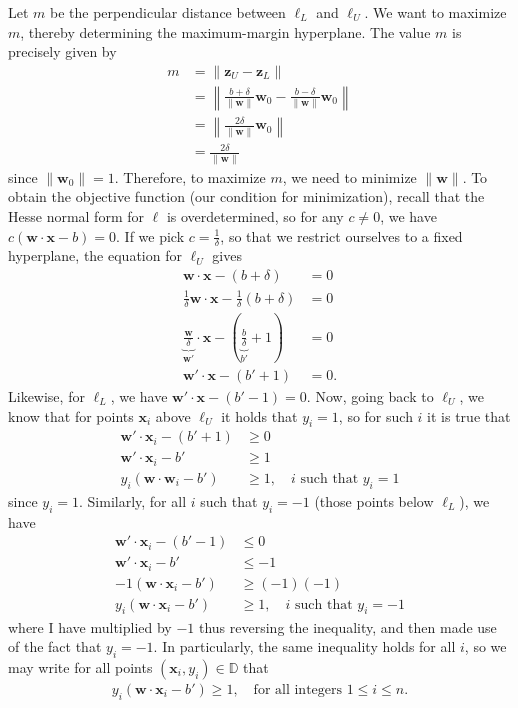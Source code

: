 \documentclass[12pt]{article}
\begin{document}
\begin{enumerate}
Let $m$ be the perpendicular distance between $\ell_L$ and $\ell_U$. We want to
maximize $m$, thereby determining the maximum-margin hyperplane. The value
$m$ is precisely given by
\begin{align*}
	m &= \|\mathbf{z}_U-\mathbf{z}_L\|\\
	&=\left\|\frac{b+\delta}{\|\mathbf{w}\|}\mathbf{w}_0 - \frac{b-\delta}{\|\mathbf{w}\|}\mathbf{w}_0\right\|\\
	&=\left\|\frac{2\delta}{\|\mathbf{w}\|}\mathbf{w}_0\right\|\\
	&=\frac{2\delta}{\|\mathbf{w}\|}
\end{align*}
since $\|\mathbf{w}_0\|=1$. Therefore, to maximize $m$, we need to minimize $\|\mathbf{w}\|$.
To obtain the objective function (our condition for minimization), recall that the Hesse normal
form for $\ell$ is overdetermined, so for any $c\neq 0$, we have $c(\mathbf{w}\cdot \mathbf{x}-b)=0$.
If we pick $c=\frac{1}{\delta}$, so that we restrict ourselves to a fixed hyperplane,
the equation for $\ell_U$ gives
\begin{align*}
	\mathbf{w}\cdot \mathbf{x}-(b+\delta)&=0\\
	\frac{1}{\delta}\mathbf{w}\cdot\mathbf{x}-\frac{1}{\delta}(b+\delta)&=0\\
	\underbrace{\frac{\mathbf{w}}{\delta}}_{\mathbf{w}'}\cdot \mathbf{x}-
	\left(\underbrace{\frac{b}{\delta}}_{b'}+1\right)&=0\\
	\mathbf{w}'\cdot \mathbf{x}-(b'+1)&=0.
\end{align*}
Likewise, for $\ell_L$, we have $\mathbf{w}'\cdot \mathbf{x}-(b'-1)=0$. Now, going
back to $\ell_U$, we know that for points $\mathbf{x}_i$ above $\ell_U$ it holds that
$y_i=1$, so for such $i$ it is true that
\begin{align*}
	\mathbf{w}'\cdot \mathbf{x}_i-(b'+1)&\geq 0\\
	\mathbf{w}'\cdot \mathbf{x}_i-b'&\geq 1\\
	y_i(\mathbf{w}\cdot \mathbf{w}_i-b')&\geq 1,\quad i \text{ such that }y_i = 1
\end{align*}
since $y_i=1$. Similarly, for all $i$ such that $y_i=-1$ (those points below $\ell_L$),
we have
\begin{align*}
	\mathbf{w}'\cdot \mathbf{x}_i-(b'-1) &\leq 0\\
	\mathbf{w}'\cdot \mathbf{x}_i-b'&\leq -1\\
	-1(\mathbf{w}\cdot \mathbf{x}_i-b')&\geq (-1)(-1)\\
	y_i(\mathbf{w}\cdot \mathbf{x}_i-b')&\geq 1,\quad i \text{ such that } y_i=-1
\end{align*}
where I have multiplied by $-1$ thus reversing the inequality, and then made use of
the fact that $y_i=-1$. In particularly, the same inequality holds for all $i$,
so we may write for all points $(\mathbf{x}_i, y_i)\in\mathbb{D}$ that
\begin{align}
	y_i(\mathbf{w}\cdot \mathbf{x}_i-b') \geq 1,\quad \text{for all integers }1\leq i\leq n.
	\label{eqn:2c}
\end{align}


\end{enumerate}
\end{document}
